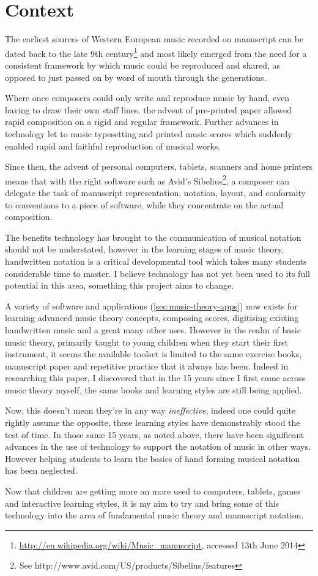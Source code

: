 \section{Context}

The earliest sources of Western European music recorded on manuscript can be dated back to the late 9th century\footnote{\url{http://en.wikipedia.org/wiki/Music_manuscript}, accessed 13th June 2014} and most likely emerged from the need for a consistent framework by which music could be reproduced and shared, as opposed to just passed on by word of mouth through the generations.

Where once composers could only write and reproduce music by hand, even having to draw their own staff lines, the advent of pre-printed paper allowed rapid composition on a rigid and regular framework. Further advances in technology let to music typesetting and printed music scores which suddenly enabled rapid and faithful reproduction of musical works.

Since then, the advent of personal computers, tablets, scanners and home printers means that with the right software such as Avid's Sibelius\footnote{See http://www.avid.com/US/products/Sibelius/features}, a composer can delegate the task of manuscript representation, notation, layout, and conformity to conventions to a piece of software, while they concentrate on the actual composition.

The benefits technology has brought to the communication of musical notation should not be understated, however in the learning stages of music theory, handwritten notation is a critical developmental tool which takes many students considerable time to master. I believe technology has not yet been used to its full potential in this area, something this project aims to change.

A variety of software and applications (\cref{sec:music-theory-apps}) now exists for learning advanced music theory concepts, composing scores, digitising existing handwritten music and a great many other uses. However in the realm of basic music theory, primarily taught to young children when they start their first instrument, it seems the available toolset is limited to the same exercise books, manuscript paper and repetitive practice that it always has been. Indeed in researching this paper, I discovered that in the 15 years since I first came across music theory myself, the same books and learning styles are still being applied.

Now, this doesn't mean they're in any way \emph{ineffective}, indeed one could quite rightly assume the opposite, these learning styles have demonstrably stood the test of time. In those same 15 years, as noted above, there have been significant advances in the use of technology to support the notation of music in other ways.  However helping students to learn the basics of hand forming musical notation has been neglected.

Now that children are getting more an more used to computers, tablets, games and interactive learning styles, it is my aim to try and bring some of this technology into the area of fundamental music theory and manuscript notation.